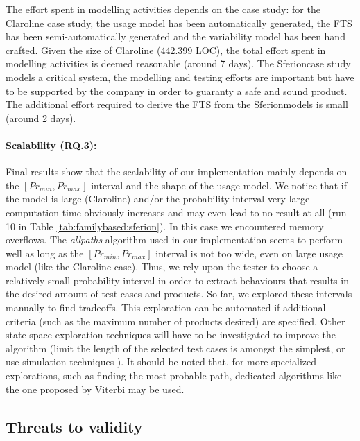 The effort spent in modelling activities depends on the case study: for the Claroline case study, the usage model has been automatically generated, the FTS has been semi-automatically generated and the variability model has been hand crafted. Given the size of Claroline (442.399 LOC), the total effort spent in modelling activities is deemed reasonable (around 7 days). The Sferion\texttrademark case study models a critical system, the modelling and testing efforts are important but have to be supported by the company in order to guaranty a safe and sound product. The additional effort required to derive the FTS from the Sferion\texttrademark models is small (around 2 days).


\paragraph{Scalability (RQ.3):}

Final results show that the scalability of our implementation mainly depends on the $[Pr_{min}, Pr_{max}]$ interval and the shape of the usage model. We notice that if the model is large (Claroline)  and/or the probability  interval very large computation time obviously increases and may even lead to no result at all  (\eg run 10 in Table \ref{tab:familybased:sferion}). In this case we encountered memory overflows. The \emph{allpaths} algorithm used in our implementation seems to perform well as long as the $[Pr_{min}, Pr_{max}]$ interval is not too wide, even on large usage model (like the Claroline case). Thus, we rely upon the tester to choose a relatively small probability interval in order to extract behaviours that results in the desired amount of test cases and products. So far, we explored these intervals manually to find tradeoffs. This exploration can be automated if additional criteria (such as the maximum number of products desired) are specified. Other state space exploration techniques will have to be investigated to improve the algorithm (\eg limit the length of the selected test cases is amongst the simplest, or use simulation techniques \cite{Baier2008}). It should be noted that, for more specialized explorations, such as finding the most probable path, dedicated algorithms like the one proposed by Viterbi \cite{Viterbi1967} may be used.    


\subsection{Threats to validity}


